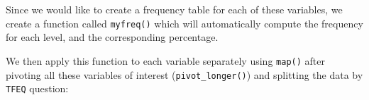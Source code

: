 \documentclass[
]{book}
\newenvironment{Shaded}{\begin{snugshade}}{\end{snugshade}}
\newcommand{\AttributeTok}[1]{\textcolor[rgb]{0.77,0.63,0.00}{#1}}
\newcommand{\ControlFlowTok}[1]{\textcolor[rgb]{0.13,0.29,0.53}{\textbf{#1}}}
\newcommand{\FunctionTok}[1]{\textcolor[rgb]{0.00,0.00,0.00}{#1}}
\newcommand{\NormalTok}[1]{#1}
\newcommand{\OtherTok}[1]{\textcolor[rgb]{0.56,0.35,0.01}{#1}}
\newcommand{\SpecialCharTok}[1]{\textcolor[rgb]{0.00,0.00,0.00}{#1}}
\begin{document}
Since we would like to create a frequency table for each of these variables, we create a function called \texttt{myfreq()} which will automatically compute the frequency for each level, and the corresponding percentage.

\begin{Shaded}
\end{Shaded}

We then apply this function to each variable separately using \texttt{map()} after pivoting all these variables of interest (\texttt{pivot\_longer()}) and splitting the data by \texttt{TFEQ} question:
\end{document}
